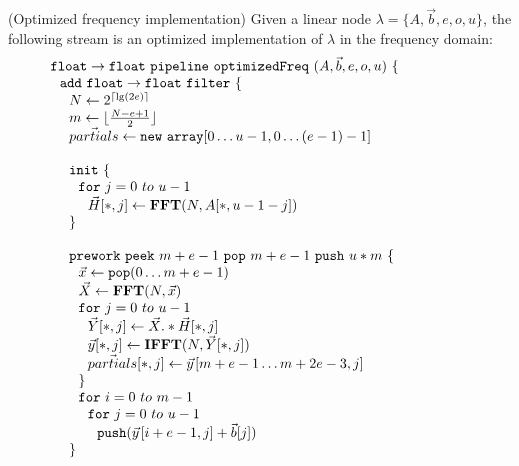 \begin{transformation} (Optimized frequency implementation)
Given a linear node $\lambda = \{A, {\vec b}, e, o, u\}$, the
following stream is an optimized implementation of $\lambda$ in the
frequency domain: \\
\begin{equation} \nonumber
  \begin{array}{ll}

    {\tt float \rightarrow float}~{\tt pipeline~optimizedFreq~}(A, {\vec b}, e, o, u){\tt ~\{} & \hspace{40pt}\\
    ~~{\tt add~float \rightarrow float~filter~\{}\\
    ~~~~N \leftarrow 2^{\lceil \lg(2e) \rceil} \\
    ~~~~m \leftarrow \lfloor \frac{N-e+1}{2} \rfloor \\
    ~~~~\vec{partials} \leftarrow {\tt new~array}[0\dots u-1,0 \dots (e-1)-1] \\
    \\
    ~~~~{\tt init}~{\tt \{} \\
    ~~~~~~{\tt for}~j=0~to~u-1\\
    ~~~~~~~~\vec{H}[*,j] \leftarrow \mathbf{FFT}(N,A[*,u-1-j]) \\
    ~~~~{\tt \}} \\
    \\
    ~~~~{\tt prework}~{\tt peek}~m+e-1~{\tt pop}~m+e-1~{\tt push}~u*m~{\tt \{}\\
    ~~~~~~\vec{x} \leftarrow {\tt pop}(0 \dots m+e-1) \\
    ~~~~~~\vec{X} \leftarrow \mathbf{FFT} (N, \vec{x}) \\
    ~~~~~~{\tt for}~j=0~to~u-1\\
    ~~~~~~~~\vec{Y}[*,j] \leftarrow \vec{X} .* \vec{H}[*,j] \\
    ~~~~~~~~\vec{y}[*,j] \leftarrow \mathbf{IFFT}(N, \vec{Y}[*,j]) \\
    ~~~~~~~~\vec{partials}[*,j] \leftarrow \vec{y}\hspace{1pt}[m+e-1 \dots m+2e-3,j] \\
    ~~~~~~{\tt \}} \\
    ~~~~~~{\tt for}~i=0~to~m-1\\
    ~~~~~~~~{\tt for}~j=0~to~u-1\\
    ~~~~~~~~~~{\tt push}(\vec{y}\hspace{1pt}[i+e-1,j] + \vec{b}[j]) \\
    ~~~~{\tt \}} \\

\end{array}
\end{equation}
\end{transformation}
